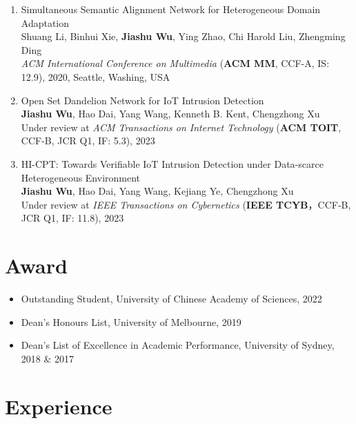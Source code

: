 \documentclass[letterpaper,11pt]{article}
\begin{document}
\begin{enumerate}
  \item Simultaneous Semantic Alignment Network for Heterogeneous Domain Adaptation\\
  Shuang Li, Binhui Xie, \textbf{Jiashu Wu}, Ying Zhao, Chi Harold Liu\textsuperscript{\Letter}, Zhengming Ding\\
  \textit{ACM International Conference on Multimedia} (\textbf{ACM MM}, CCF-A, IS: 12.9), 2020, Seattle, Washing, USA

  \item Open Set Dandelion Network for IoT Intrusion Detection\\
  \textbf{Jiashu Wu}, Hao Dai, Yang Wang\textsuperscript{\Letter}, Kenneth B. Kent, Chengzhong Xu\\
  Under review at \textit{ACM Transactions on Internet Technology} (\textbf{ACM TOIT}, CCF-B, JCR Q1, IF: 5.3), 2023

  \item HI-CPT: Towards Verifiable IoT Intrusion Detection under Data-scarce Heterogeneous Environment\\
  \textbf{Jiashu Wu}, Hao Dai, Yang Wang\textsuperscript{\Letter}, Kejiang Ye, Chengzhong Xu\\
  Under review at \textit{IEEE Transactions on Cybernetics} (\textbf{IEEE TCYB}，CCF-B, JCR Q1, IF: 11.8), 2023
\end{enumerate}

\vspace{1pt}

\section{Award}
\begin{itemize}
  \item Outstanding Student, University of Chinese Academy of Sciences, 2022
  \item Dean's Honours List, University of Melbourne, 2019
  \item Dean's List of Excellence in Academic Performance, University of Sydney, 2018 \& 2017
\end{itemize}

\vspace{1pt}

\section{Experience}
\end{document}
